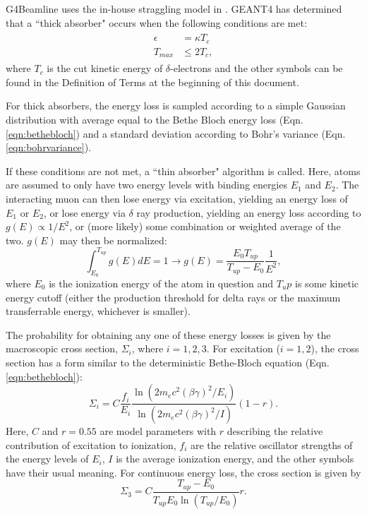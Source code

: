  \label{sec:g4blstraggling}

G4Beamline uses the in-house straggling model in \cite{geant4}.  GEANT4 has determined that a ``thick absorber" occurs when the following conditions are met:
\begin{align}\label{eqn:G4StragglingThickTest}
\begin{split}
\epsilon &= \kappa T_c  \\
T_{max} &\le 2T_c,
\end{split}
\end{align}
where $T_c$ is the cut kinetic energy of $\delta$-electrons and the other symbols can be found in the Definition of Terms at the beginning of this document.

For thick absorbers, the energy loss is sampled according to a simple Gaussian distribution with average equal to the Bethe Bloch energy loss (Eqn. \ref{eqn:bethebloch}) and a standard deviation according to Bohr's variance (Eqn. \ref{eqn:bohrvariance}).

If these conditions are not met, a ``thin absorber" algorithm is called. Here, atoms are assumed to only have two energy levels with binding energies $E_1$ and $E_2$. The interacting muon can then lose energy via excitation, yielding an energy loss of $E_1$ or $E_2$, or lose energy via $\delta$ ray production, yielding an energy loss according to $ g(E) \propto 1/E^2 $, or (more likely) some combination or weighted average of the two. $g(E)$ may then be normalized:
\begin{equation}
\int_{E_0}^{T_{up}} g(E) dE = 1 \rightarrow g(E)=\frac{E_0 T_{up}}{T_{up}-E_0}\frac{1}{E^2},
\label{eqn:G4StragglingIonization}
\end{equation}
where $E_0$ is the ionization energy of the atom in question and $T_up$ is some kinetic energy cutoff (either the production threshold for delta rays or the maximum transferrable energy, whichever is smaller).

The probability for obtaining any one of these energy losses is given by the macroscopic cross section, $\Sigma_i$, where $i=1,2,3$. For excitation ($i=1,2$), the cross section has a form similar to the deterministic Bethe-Bloch equation (Eqn. \ref{eqn:bethebloch}):
\begin{equation}\label{eqn:G4StragglingCrossSectionExcitation}
\Sigma_i=C\frac{f_i}{E_i}\frac{\ln(2m_e c^2(\beta\gamma)^2/E_i)}{\ln(2m_e c^2(\beta\gamma)^2/I)}(1-r).
\end{equation}
Here, $C$ and $r=0.55$ are model parameters with $r$ describing the relative contribution of excitation to ionization, $f_i$ are the relative oscillator strengths of the energy levels of $E_i$, $I$ is the average ionization energy, and the other symbols have their usual meaning. For continuous energy loss, the cross section is given by
\begin{equation}\label{eqn:G4StragglingCrossSectionIonization}
\Sigma_3=C\frac{T_{up}-E_0}{T_{up}E_0\ln(T_{up}/E_0)}r.
\end{equation}

